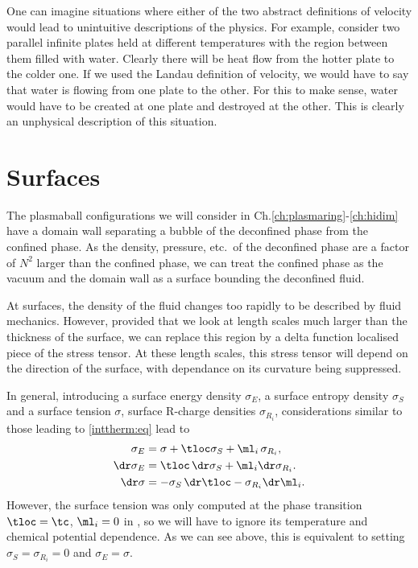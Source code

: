 One can imagine situations where either of the two abstract definitions of velocity would lead to unintuitive descriptions of the physics. For example, consider two parallel infinite plates held at different temperatures with the region between them filled with water. Clearly there will be heat flow from the hotter plate to the colder one. If we used the Landau definition of velocity, we would have to say that water is flowing from one plate to the other. For this to make sense, water would have to be created at one plate and destroyed at the other. This is clearly an unphysical description of this situation.





\section{Surfaces}\label{sec:surface}

The plasmaball configurations we will consider in Ch.\ref{ch:plasmaring}-\ref{ch:hidim} have a domain wall separating a bubble of the deconfined phase from the confined phase. As the density, pressure, etc.\ of the deconfined phase are a factor of $N^2$ larger than the confined phase, we can treat the confined phase as the vacuum and the domain wall as a surface bounding the deconfined fluid.

At surfaces, the density of the fluid changes too rapidly to be described by fluid mechanics. However, provided that we look at length scales much larger than the thickness of the surface, we can replace this region by a delta function localised piece of the stress tensor. At these length scales, this stress tensor will depend on the direction of the surface, with dependance on its curvature being suppressed.

In general, introducing a surface energy density $\sigma_E$, a surface entropy density $\sigma_S$ and a surface tension $\sigma$, surface R-charge densities $\sigma_{R_i}$, considerations similar to those leading to \eqref{inttherm:eq} lead to
%
\begin{equation*}
  \begin{split}
    \sigma_E &= \sigma + \tloc \sigma_S + \ml_i \,\sigma_{R_i},
    \\
    \dr\sigma_E &= \tloc\, \dr\sigma_S + \ml_i \dr\sigma_{R_i}.
    \\
    \dr\sigma &= -\sigma_S\, \dr\tloc -\sigma_{R_i} \dr\ml_i.
  \end{split}
\end{equation*}
%
However, the surface tension was only computed at the phase transition $\tloc=\tc$, $\ml_i=0$ in \cite{Aharony:2005bm}, so we will have to ignore its temperature and chemical potential dependence. As we can see above, this is equivalent to setting $\sigma_S=\sigma_{R_i}=0$ and $\sigma_E=\sigma$.

